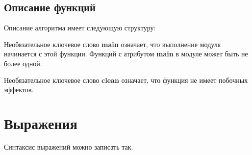 \documentclass[10pt]{report}
\begin{document}
    \subsection{Описание функций}
Описание алгоритма имеет следующую структуру:

\textcolor{Green}{%
}


Необязательное ключевое слово \textbf{main} означает, что выполнение модуля начинается с этой функции. Функций с атрибутом \textbf{main} в модуле может быть не более одной.
    
Необязательное ключевое слово \textbf{clean} означает, что функция не имеет побочных эффектов.   
   
\section{Выражения}

Синтаксис выражений можно записать так:
\end{document}
